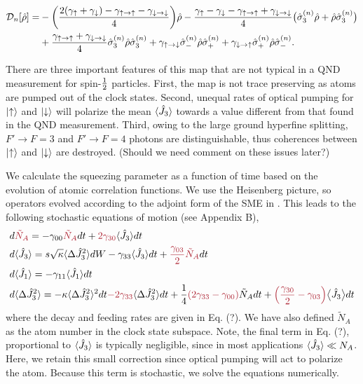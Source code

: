 \documentclass[preprint,aps,pra,onecolumn]{revtex4-1} %
\newcommand{\jz}{\hat{J}_3}
\newcommand{\gammauu}{\gamma_{\uparrow \rightarrow \uparrow}}
\newcommand{\gammadd}{\gamma_{\downarrow \rightarrow \downarrow}}
\newcommand{\gammaud}{\gamma_{\uparrow \rightarrow \downarrow}}
\newcommand{\gammadu}{\gamma_{\downarrow \rightarrow \uparrow}}
\newcommand{\gammau}{\gamma_{\uparrow}}
\newcommand{\gammad}{\gamma_{\downarrow}}
\newcommand{\half}{\smallfrac{1}{2}}
\newcommand{\comment}[1]{{\color{Maroon} #1}}
\begin{document}
	\begin{align} \label{Eq::OpticalPumpingMapSchr}
		\mathcal{D}_n [\hat{\rho}] 
				=& - \bigg( \frac{2(\gammau+ \gammad) - \gammauu - \gammadd}{4} \bigg) \hat{\rho} - \frac{ \gammau - \gammad - \gammauu + \gammadd }{4} \big( \hat{\sigma}_3^{(n)} \hat{\rho}+ \hat{\rho} \hat{\sigma}_3^{(n)} \big) \nn \\
		&+ \frac{\gammauu+\gammadd}{4} \hat{\sigma}_ 3^{(n)}\hat{\rho} \hat{\sigma}_3^{(n)} + \gammaud  \hat{\sigma}_-^{(n)} \hat{\rho} \hat{\sigma}_+^{(n)} + \gammadu  \hat{\sigma}_+^{(n)} \hat{\rho} \hat{\sigma}_- ^{(n)}.   
	\end{align} 
	
There are three important features of this map that are not typical in a QND measurement for spin-$\half$ particles.  
First, the map is not trace preserving as atoms are pumped out of the clock states. 
Second, unequal rates of optical pumping for $\lvert{\uparrow}\rangle$ and $\lvert{\downarrow}\rangle$ will polarize the mean $\expt{\jz}$ towards a value different from that found in the QND measurement. 
Third, owing to the large ground hyperfine splitting, $F' \rightarrow F=3$ and $F' \rightarrow F=4$ photons are distinguishable, thus coherences between $\lvert{\uparrow}\rangle$ and $\lvert{\downarrow}\rangle$ are destroyed. \comment{(Should we need comment on these issues  later?)}

We calculate the squeezing parameter as a function of time based on the evolution of atomic correlation functions.  We use the Heisenberg picture, so operators evolved according to the adjoint form of the SME in .  This leads to the following stochastic equations of motion (see Appendix B),
\begin{align}
&d \comment{\tilde{N}_A} = -\gamma_{00} \comment{\tilde{N}_A}  dt +  \comment{2\gamma_{30}} \expt{\hat{J}_3} dt \\
&d \expt{\hat{J}_3}  = s\sqrt{\kappa}\expt{\Delta \hat{J}_3^2}dW -\gamma_{33} \expt{\hat{J}_3}dt +\comment{\frac{\gamma_{03}}{2}} \comment{\tilde{N}_A} dt   \\
&d \expt{\hat{J}_1}  = -\gamma_{11} \expt{\hat{J}_1} dt  \\
&d \expt{\Delta \hat{J}_3^2}  = - \kappa \expt{\Delta \hat{J}_3^2}^2 dt \comment{- 2 \gamma_{33}} \expt{\Delta \hat{J}_3^2}dt + \frac{1}{4}\comment{\left(2\gamma_{33}-\gamma_{00} \right)} \tilde{N}_A dt + \comment{\left(\frac{\gamma_{30}}{2}-\gamma_{03}\right)} \expect{\hat{J}_3} dt   \label{eq:dDeltaJ3^2} 
\end{align}
where the decay and feeding rates are given in Eq. (?).  
We have also defined $ \tilde{N}_A $ as the atom number in the clock state subspace.
Note, the final term in Eq. (?), proportional to $\langle{\hat{J}_3}\rangle$ is typically negligible, since in most applications $\langle{\hat{J}_3}\rangle \ll N_A$.  
Here, we retain this small correction since optical pumping will act to polarize the atom.  
Because this term is stochastic, we  solve the equations numerically. 
\end{document}
